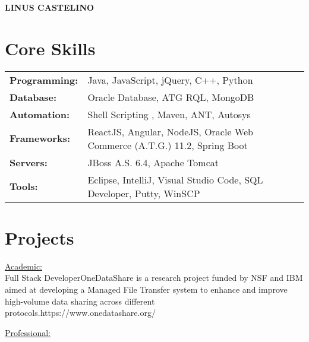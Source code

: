 \documentclass[letter]{twentysecondcv}
\begin{document}
{\fontsize{28pt}{12pt}\selectfont\color{mainblue}\textbf{LINUS CASTELINO}} \\

\fontsize{10.5pt}{10pt}
\makeprofile %

\section{Core Skills}

\begin{tabular}{p{2.5cm}p{10.5cm}}
	\textbf{Programming:} & {Java, JavaScript, jQuery, C++, Python}\\
 	\textbf{Database:} & {Oracle Database, ATG RQL, MongoDB}\\
 	\textbf{Automation:} & {Shell Scripting , Maven, ANT, Autosys}\\
 	\textbf{Frameworks:} & {ReactJS, Angular, NodeJS, Oracle Web Commerce (A.T.G.) 11.2, Spring Boot}\\ 
 	\textbf{Servers:} & {JBoss A.S. 6.4, Apache Tomcat}\\
    \textbf{Tools:} & {Eclipse, IntelliJ, Visual Studio Code, SQL Developer, Putty, WinSCP}
    \vspace{5mm}
\end{tabular}

\section{Projects}

\begin{twenty} 
    \underline{Academic:}\\
	 {Full Stack Developer}{OneDataShare is a research project funded by NSF and IBM aimed at developing a Managed File Transfer system to enhance and improve high-volume data sharing across different protocols.}{https://www.onedatashare.org/}
	
	
	\underline{Professional:}\\
\end{twenty}
\end{document}
